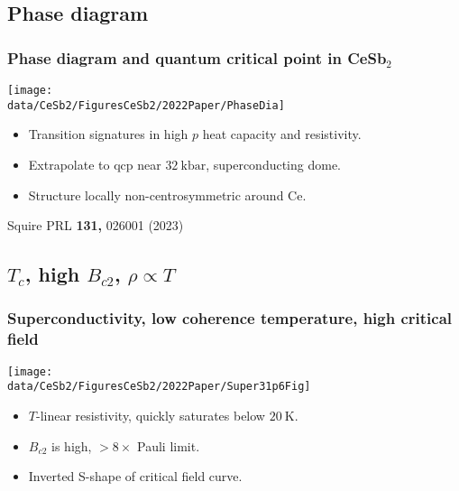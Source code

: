 
\subsection{Phase diagram}

\begin{frame}[label=PhaseDia]
\frametitle{Phase diagram and quantum critical point in CeSb$_2$}

\centerline{\texttt{[image: \\data/CeSb2/FiguresCeSb2/2022Paper/PhaseDia]}}

\begin{itemize}
\item Transition signatures in high $p$ heat capacity and resistivity.
\item Extrapolate to qcp near $\SI{32}{\kilo\bar}$, superconducting dome.
\item Structure locally non-centrosymmetric around Ce.

\end{itemize}

\vfill
\centerline{\makebox[\linewidth]{\rule{0.85\textwidth}{0.4pt}}}

\centerline{\scriptsize Squire PRL {\bf 131,} 026001 (2023)}

\end{frame}


\subsection{$T_c$, high $B_{c2}$, $\rho \propto T$}

\begin{frame}[label=KeyResult]
\frametitle{Superconductivity, low coherence temperature, high critical field }

\centerline{\texttt{[image: \\data/CeSb2/FiguresCeSb2/2022Paper/Super31p6Fig]}}
\begin{itemize}
\item $T$-linear resistivity, quickly saturates below $\SI{20}{\kelvin}$.
\item $B_{c2}$ is high, $>8\times$ Pauli limit.
\item Inverted S-shape of critical field curve.
\end{itemize}


\end{frame}


